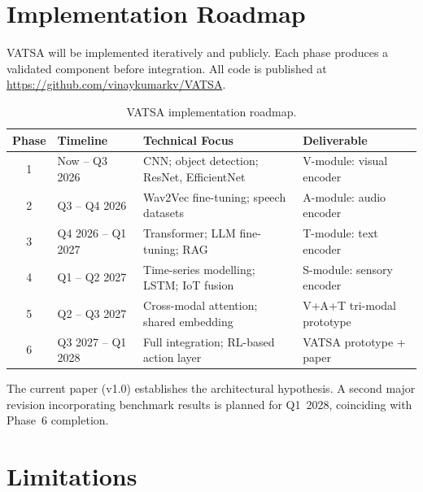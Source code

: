 \documentclass[11pt,a4paper]{article}
\begin{document}
\section{Implementation Roadmap}
\label{sec:roadmap}

VATSA will be implemented iteratively and publicly.  Each phase produces a validated
component before integration.  All code is published at
\url{https://github.com/vinaykumarkv/VATSA}.

\begin{table}[ht]
\centering
\caption{VATSA implementation roadmap.}
\label{tab:roadmap}
\renewcommand{\arraystretch}{1.3}
\begin{tabularx}{\textwidth}{clXl}
\toprule
\textbf{Phase} & \textbf{Timeline} & \textbf{Technical Focus} & \textbf{Deliverable} \\
\midrule
1 & Now -- Q3 2026       & CNN; object detection; ResNet, EfficientNet          & V-module: visual encoder \\
2 & Q3 -- Q4 2026        & Wav2Vec fine-tuning; speech datasets                 & A-module: audio encoder \\
3 & Q4 2026 -- Q1 2027   & Transformer; LLM fine-tuning; RAG                    & T-module: text encoder \\
4 & Q1 -- Q2 2027        & Time-series modelling; LSTM; IoT fusion              & S-module: sensory encoder \\
5 & Q2 -- Q3 2027        & Cross-modal attention; shared embedding              & V+A+T tri-modal prototype \\
6 & Q3 2027 -- Q1 2028   & Full integration; RL-based action layer              & VATSA prototype + paper \\
\bottomrule
\end{tabularx}
\end{table}

The current paper (v1.0) establishes the architectural hypothesis.  A second major
revision incorporating benchmark results is planned for Q1~2028, coinciding with
Phase~6 completion.

\section{Limitations}
\label{sec:limitations}
\end{document}
